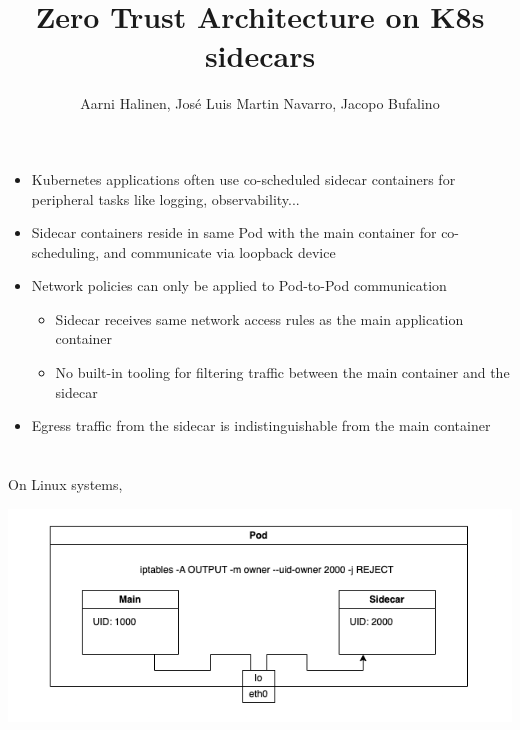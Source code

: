 \documentclass[portrait,a1,final]{a0poster}
\begin{document}
\title{Zero Trust Architecture on K8s sidecars}
\author{Aarni Halinen, José Luis Martin Navarro, Jacopo Bufalino}

\makeheader

\begin{minipage}{\posterwidth}
  \begin{minipage}{\singlecolumnwidth}
    \section*{}
    \begin{itemize}
      \item Kubernetes applications often use co-scheduled sidecar containers for peripheral tasks like logging, observability...
      \item Sidecar containers reside in same Pod with the main container for co-scheduling, and communicate via loopback device
      \item Network policies can only be applied to Pod-to-Pod communication
      \begin{itemize}
        \item Sidecar receives same network access rules as the main application container
        \item No built-in tooling for filtering traffic between the main container and the sidecar
      \end{itemize}
      \item Egress traffic from the sidecar is indistinguishable from the main container
    \end{itemize}
  \end{minipage}

  \begin{minipage}[t]{\doublecolumnwidth}
    \vspace{\sectionspace}
    \section*{}

    On Linux systems,


    \includegraphics[width=\linewidth]{figures/iptables.png}
  \end{minipage}
  \hspace{\columnspace}
  \begin{minipage}[t]{\doublecolumnwidth}
    \vspace{\sectionspace}

\end{minipage}
\end{minipage}
\end{document}
